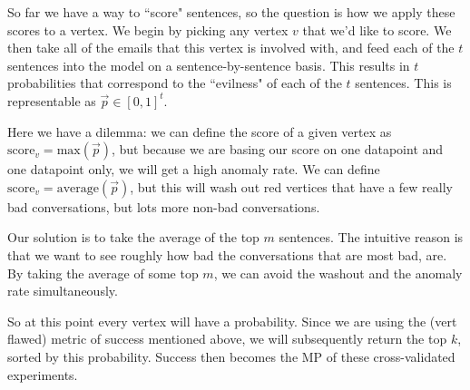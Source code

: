 \documentclass[11pt]{article}
\begin{document}
So far we have a way to ``score" sentences, so the question is how we apply these scores to a vertex. We begin by picking any vertex $v$ that we'd like to score. We then take all of the emails that this vertex is involved with, and feed each of the $t$ sentences into the model on a sentence-by-sentence basis. This results in $t$ probabilities that correspond to the ``evilness" of each of the $t$ sentences. This is representable as $\vec{p} \in [0,1]^t$.

Here we have a dilemma: we can define the score of a given vertex as $\text{score}_v = \text{max}(\vec{p})$, but because we are basing our score on one datapoint and one datapoint only, we will get a high anomaly rate. We can define $\text{score}_v = \text{average}(\vec{p})$, but this will wash out red vertices that have a few really bad conversations, but lots more non-bad conversations.

Our solution is to take the average of the top $m$ sentences. The intuitive reason is that we want to see roughly how bad the conversations that are most bad, are. By taking the average of some top $m$, we can avoid the washout and the anomaly rate simultaneously.

So at this point every vertex will have a probability. Since we are using the (vert flawed) metric of success mentioned above, we will subsequently return the top $k$, sorted by this probability. Success then becomes the MP of these cross-validated experiments.
\end{document}
